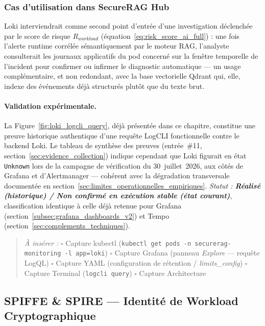 \subsubsection{Cas d'utilisation dans SecureRAG Hub}
Loki interviendrait comme second point d'entrée d'une investigation déclenchée par le score de risque $R_{workload}$ (équation~\ref{eq:risk_score_ai_full}) : une fois l'alerte runtime corrélée sémantiquement par le moteur RAG, l'analyste consulterait les journaux applicatifs du pod concerné sur la fenêtre temporelle de l'incident pour confirmer ou infirmer le diagnostic automatique — un usage complémentaire, et non redondant, avec la base vectorielle Qdrant qui, elle, indexe des événements déjà structurés plutôt que du texte brut.

\paragraph{Validation expérimentale.}
La Figure~\ref{fig:loki_logcli_query}, déjà présentée dans ce chapitre, constitue une preuve historique authentique d'une requête LogCLI fonctionnelle contre le backend Loki. Le tableau de synthèse des preuves (entrée~\#11, section~\ref{sec:evidence_collection}) indique cependant que Loki figurait en état \texttt{Unknown} lors de la campagne de vérification du 30~juillet~2026, aux côtés de Grafana et d'Alertmanager — cohérent avec la dégradation transversale documentée en section~\ref{sec:limites_operationnelles_empiriques}. \textit{Statut : \textbf{Réalisé (historique) / Non confirmé en exécution stable (état courant)}}, classification identique à celle déjà retenue pour Grafana (section~\ref{subsec:grafana_dashboards_v2}) et Tempo (section~\ref{sec:complements_techniques}).

\begin{quote}
\scriptsize
\textit{À insérer :} \quad
$\square$ Capture kubectl (\texttt{kubectl get pods -n securerag-monitoring -l app=loki}) \quad
$\square$ Capture Grafana (panneau \textit{Explore} — requête LogQL) \quad
$\square$ Capture YAML (configuration de rétention / \textit{limits\_config}) \quad
$\square$ Capture Terminal (\texttt{logcli query}) \quad
$\square$ Capture Architecture
\end{quote}

\subsection{SPIFFE \& SPIRE — Identité de Workload Cryptographique}
\label{subsec:spiffe_spire_v2}

